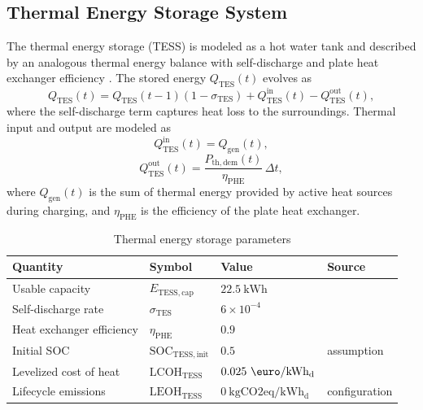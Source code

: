 \documentclass[12pt,a4paper]{report}
\begin{document}
\subsection{Thermal Energy Storage System}
\label{subsec:tess}
The thermal energy storage (TESS) is modeled as a hot water tank and described by an analogous thermal energy balance with self-discharge and plate heat exchanger efficiency \cite{DANGELO2026121627,solarheateurope_tess}. The stored energy \(Q_{\mathrm{TES}}(t)\) evolves as
\begin{equation}
Q_{\mathrm{TES}}(t) = Q_{\mathrm{TES}}(t-1)\left(1-\sigma_{\mathrm{TES}}\right)
+ Q_{\mathrm{TES}}^{\mathrm{in}}(t) - Q_{\mathrm{TES}}^{\mathrm{out}}(t),
\label{eq:tess_energy_balance}
\end{equation}
where the self-discharge term captures heat loss to the surroundings. Thermal input and output are modeled as
\begin{equation}
Q_{\mathrm{TES}}^{\mathrm{in}}(t) = Q_{\mathrm{gen}}(t),
\label{eq:tess_input}
\end{equation}
\begin{equation}
Q_{\mathrm{TES}}^{\mathrm{out}}(t)=\frac{P_{\mathrm{th,dem}}(t)}{\eta_{\mathrm{PHE}}}\,\Delta t,
\label{eq:tess_output}
\end{equation}
where \(Q_{\mathrm{gen}}(t)\) is the sum of thermal energy provided by active heat sources during charging, and \(\eta_{\mathrm{PHE}}\) is the efficiency of the plate heat exchanger.  

\begin{table}[H]
\centering
\caption{Thermal energy storage parameters}
\label{tab:tess_parameters}
\begin{tabular}{llll}
\hline
Quantity & Symbol & Value & Source \\
\hline
Usable capacity & \(E_{\mathrm{TESS,cap}}\) & \(22.5~\mathrm{kWh}\) & \cite{solarheateurope_tess} \\
Self-discharge rate & \(\sigma_{\mathrm{TES}}\) & \(6\times10^{-4}\) & \cite{DANGELO2026121627} \\
Heat exchanger efficiency & \(\eta_{\mathrm{PHE}}\) & \(0.9\) & \cite{DANGELO2026121627} \\
Initial SOC & \(\mathrm{SOC}_{\mathrm{TESS,init}}\) & \(0.5\) & assumption \\
Levelized cost of heat & \(\mathrm{LCOH}_{\mathrm{TESS}}\) & \(0.025~\mathrm{\text{\euro}/kWh_{d}}\) & \cite{costa_tess_finland} \\
Lifecycle emissions & \(\mathrm{LEOH}_{\mathrm{TESS}}\) & \(0~\mathrm{kgCO2eq/kWh_{d}}\) & configuration \\
\hline
\end{tabular}
\end{table}
\end{document}
